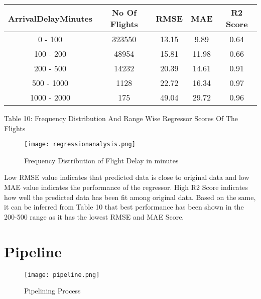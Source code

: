 \documentclass[12pt,letter-paper]{article}
\begin{document}
    \begin{table}[H]
        \begin{center}
            \begin{tabular}{ |c|c|c|c|c| } 
                \hline
                ArrivalDelayMinutes & No Of Flights & RMSE & MAE & R2 Score\\ 
                \hline
                0 - 100 & 323550 & 13.15 & 9.89 & 0.64\\ 
                \hline
                100 - 200 & 48954 & 15.81 & 11.98 & 0.66\\ 
                \hline
                200 - 500 & 14232 & 20.39 & 14.61 & 0.91\\ 
                \hline
                500 - 1000 & 1128 & 22.72 & 16.34 & 0.97\\ 
                \hline
                1000 - 2000 & 175 & 49.04 & 29.72 & 0.96\\ 
                \hline
        \end{tabular}
        \end{center}
        \begin{center}
            Table 10: Frequency Distribution And Range Wise Regressor Scores Of The Flights
    \end{center}
    \end{table}
    
    \begin{figure}[H]%
        \begin{center}
            \texttt{[image: regressionanalysis.png]}%
                \caption{Frequency Distribution of Flight Delay in minutes}  
        \end{center}
    \end{figure}
    
    Low RMSE value indicates that predicted data is close to original data and low MAE value indicates the performance of the regressor. High R2 Score indicates how well the predicted data has been fit among original data.
    Based on the same, it can be inferred from Table 10 that best performance has been shown in the 200-500 range as it has the lowest RMSE and MAE Score.
    
\section{Pipeline}

    \begin{figure}[H]%
        \begin{center}
            \texttt{[image: pipeline.png]}%
                \caption{Pipelining Process}
        \end{center}
    \end{figure}
    
\end{document}
